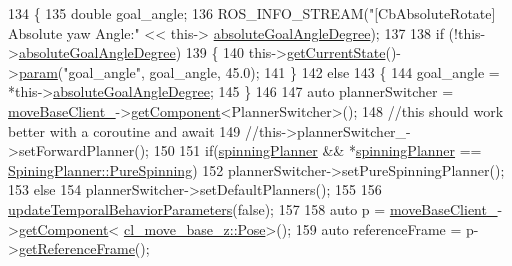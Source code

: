 \begin{DoxyCode}
134 \{
135     \textcolor{keywordtype}{double} goal\_angle;
136     ROS\_INFO\_STREAM(\textcolor{stringliteral}{"[CbAbsoluteRotate] Absolute yaw Angle:"} << this->
      \hyperlink{classcl__move__base__z_1_1CbAbsoluteRotate_ad5d0e21549940444e1cb525cda73329a}{absoluteGoalAngleDegree});
137 
138     \textcolor{keywordflow}{if} (!this->\hyperlink{classcl__move__base__z_1_1CbAbsoluteRotate_ad5d0e21549940444e1cb525cda73329a}{absoluteGoalAngleDegree})
139     \{
140         this->\hyperlink{classsmacc_1_1ISmaccClientBehavior_a34fde34e48fa13db622ee60d8374d0b8}{getCurrentState}()->\hyperlink{classsmacc_1_1ISmaccState_a4f2ff8e3eda8aa9bbb60c8ff17d0def1}{param}(\textcolor{stringliteral}{"goal\_angle"}, goal\_angle, 45.0);
141     \}
142     \textcolor{keywordflow}{else}
143     \{
144         goal\_angle = *this->\hyperlink{classcl__move__base__z_1_1CbAbsoluteRotate_ad5d0e21549940444e1cb525cda73329a}{absoluteGoalAngleDegree};
145     \}
146 
147     \textcolor{keyword}{auto} plannerSwitcher = \hyperlink{classcl__move__base__z_1_1CbMoveBaseClientBehaviorBase_ab2ef219464cfac8659b4a87c8d0db6d5}{moveBaseClient\_}->\hyperlink{classsmacc_1_1ISmaccClient_adef78db601749ca63c19e74a27cb88cc}{getComponent}<PlannerSwitcher>();
148     \textcolor{comment}{//this should work better with a coroutine and await}
149     \textcolor{comment}{//this->plannerSwitcher\_->setForwardPlanner();}
150     
151     \textcolor{keywordflow}{if}(\hyperlink{classcl__move__base__z_1_1CbAbsoluteRotate_a17d836524599af072cf2e3488e491a91}{spinningPlanner} && *\hyperlink{classcl__move__base__z_1_1CbAbsoluteRotate_a17d836524599af072cf2e3488e491a91}{spinningPlanner} == 
      \hyperlink{namespacecl__move__base__z_aab2ad3041275145f0065fb60b3299345aada5274435681a4ce04175bebfa6652f}{SpiningPlanner::PureSpinning})
152         plannerSwitcher->setPureSpinningPlanner();
153     \textcolor{keywordflow}{else}
154         plannerSwitcher->setDefaultPlanners();
155     
156     \hyperlink{classcl__move__base__z_1_1CbAbsoluteRotate_a2d8a4200dcacc00ad60c22ad2af5d4b2}{updateTemporalBehaviorParameters}(\textcolor{keyword}{false});
157 
158     \textcolor{keyword}{auto} p = \hyperlink{classcl__move__base__z_1_1CbMoveBaseClientBehaviorBase_ab2ef219464cfac8659b4a87c8d0db6d5}{moveBaseClient\_}->\hyperlink{classsmacc_1_1ISmaccClient_adef78db601749ca63c19e74a27cb88cc}{getComponent}<
      \hyperlink{classcl__move__base__z_1_1Pose}{cl\_move\_base\_z::Pose}>();
159     \textcolor{keyword}{auto} referenceFrame = p->\hyperlink{classcl__move__base__z_1_1Pose_af8c2dc151e74aa8da6b283d1c8563051}{getReferenceFrame}();

\end{DoxyCode}
